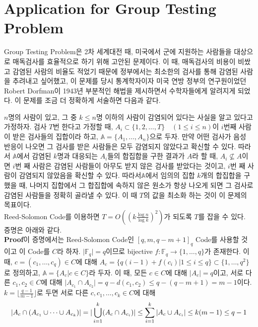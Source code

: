 \documentclass[11pt]{article}
\begin{document}
\section{Application for Group Testing Problem}
 Group Testing Problem은 2차 세계대전 때, 미국에서 군에 지원하는 사람들을 대상으로 매독검사를 효율적으로 하기 위해 고안된 문제이다. 이 때, 매독검사의 비용이 비쌌고 감염된 사람의 비율도 적었기 때문에 정부에서는 최소한의 검사를 통해 감염된 사람을 추려내고 싶어했고, 이 문제를 당시 통계학자이자 미국 연방 정부의 연구원이었던 Robert Dorfman이 1943년 부분적인 해법을 제시하면서 수학자들에게 알려지게 되었다. 이 문제를 조금 더 정확하게 서술하면 다음과 같다.
 
$n$명의 사람이 있고, 그 중 $k\leq n$명 이하의 사람이 감염되어 있다는 사실을 알고 있다고 가정하자. 검사 $T$번 한다고 가정할 때, $A_{i}\subset \{1,2,\dots,T\}\quad(1\leq i\leq n)$이 $i$번째 사람이 받은 검사들의 집합이라 하고, $\mathbb{A}=\{A_{1},\dots,A_{n}\}$으로 두자. 만약 어떤 검사가 음성 반응이 나오면 그 검사를 받은 사람들은 모두 감염되지 않았다고 확신할 수 있다. 따라서 $\mathbb{A}$에서 감염된 $k$명과 대응되는 $A_{i}$들의 합집합을 구한 결과가 $A$라 할 때, $A_{i}\nsubseteq A$이면 $i$번 째 사람은 감염된 사람들이 아무도 받지 않은 검사를 받았다는 것이고, $i$번 째 사람이 감염되지 않았음을 확신할 수 있다. 따라서$\mathbb{A}$에서 임의의 집합 $k$개의 합집합을 구했을 때, 나머지 집합에서 그 합집합에 속하지 않은 원소가 항상 나오게 되면 그 검사로 감염된 사람들을 정확히 골라낼 수 있다. 이 때 $T$의 값을 최소화 하는 것이 이 문제의 목표이다.\\
Reed-Solomon Code를 이용하면 $T=O\left(\left(k\frac{\log n}{\log k} \right)^{2}\right)$가 되도록 $T$를 잡을 수 있다. 증명은 아래와 같다.\\
\textbf{Proof}이 증명에서는 Reed-Solomon Code인 $[q,m,q-m+1]_{q}$ Code를 사용할 것이고 이 Code를 $C$라 하자.  $\vert\mathbb{F}_{q}\vert=q$이므로 bijective $f:\mathbb{F}_{q}\to \{1,\dots,q\}$가 존재한다.  이 때, $c=(c_{1},\dots,c_{q})\in C$에 대해 $A_{c}=\{q(i-1)+f(c_{i})\lvert1\leq i\leq q\}\subset\{1,\dots,q^{2}\}$로 정의하고, $\mathbb{A}=\{A_{c}\vert c\in C\}$라 두자.  이 때, 모든 $c\in C$에 대해 $\vert A_{c}\vert=q$이고, 서로 다른 $c_{1},c_{2}\in C$에 대해  $\vert A_{c_1}\cap A_{c_2}\vert=q-d(c_{1},c_{2})\leq q-(q-m+1)=m-1$이다.\\
$k=\lfloor\frac{q-1}{m-1}\rfloor$로 두면 서로 다른 $c,c_{1},\dots,c_{k}\in C$에 대해
\begin{displaymath}
\vert A_{c}\cap (A_{c_{1}}\cup\dots\cup A_{c_{k}} )\vert=\arrowvert\bigcup_{i=1}^{k}(A_{c}\cap A_{c_{i}}) \arrowvert\leq\sum_{i=1}^{k}\vert A_{c}\cup A_{c_{i}}\vert\leq k(m-1)\leq q-1
\end{displaymath}
\end{document}
